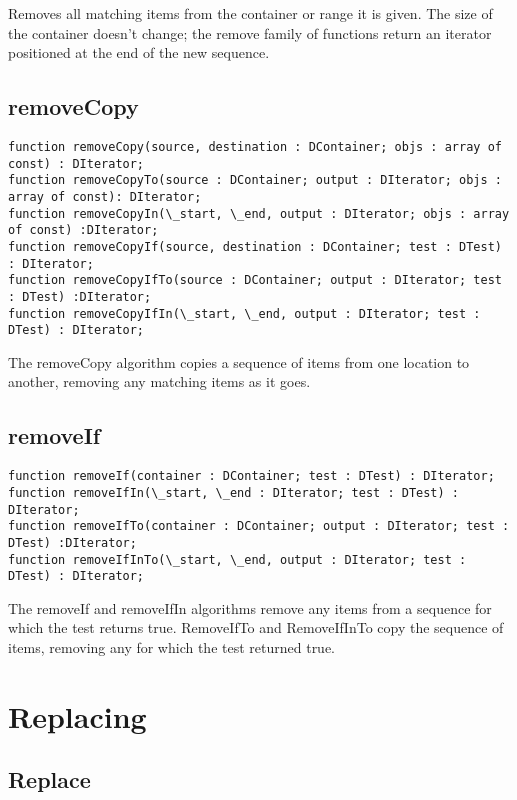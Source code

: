 \documentclass{report}
\begin{document}
Removes all matching items from the container or range it is given. The size
of the container doesn't change; the remove family of functions return an
iterator positioned at the end of the new sequence.

\subsection{removeCopy}

\begin{lstlisting}
function removeCopy(source, destination : DContainer; objs : array of const) : DIterator;
function removeCopyTo(source : DContainer; output : DIterator; objs : array of const): DIterator;
function removeCopyIn(\_start, \_end, output : DIterator; objs : array of const) :DIterator;
function removeCopyIf(source, destination : DContainer; test : DTest) : DIterator;
function removeCopyIfTo(source : DContainer; output : DIterator; test : DTest) :DIterator;
function removeCopyIfIn(\_start, \_end, output : DIterator; test : DTest) : DIterator;
\end{lstlisting}

The removeCopy algorithm copies a sequence of items from one location to
another, removing any matching items as it goes.

\subsection{removeIf}

\begin{lstlisting}
function removeIf(container : DContainer; test : DTest) : DIterator;
function removeIfIn(\_start, \_end : DIterator; test : DTest) : DIterator;
function removeIfTo(container : DContainer; output : DIterator; test : DTest) :DIterator;
function removeIfInTo(\_start, \_end, output : DIterator; test : DTest) : DIterator;
\end{lstlisting}

The removeIf and removeIfIn algorithms remove any items from a sequence for
which the test returns true. RemoveIfTo and RemoveIfInTo copy the sequence
of items, removing any for which the test returned true.

\section{Replacing}

\subsection{Replace}
\end{document}
